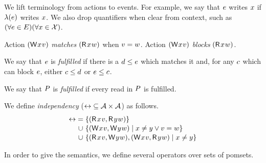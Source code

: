 We lift terminology from actions to events.  For example, we say that $e$
writes $x$ if $\lambda(e)$ writes $x$.  We also drop quantifiers
when clear from context, such as
$(\forall e\in E)(\forall x\in\mathcal{X})$.

\begin{definition}
  Action $\DWP{\aLoc}{\aVal}$ \emph{matches} $\DRP{\aLoc}{\bVal}$ when $v=w$.
  Action $\DWP{\aLoc}{\aVal}$ \emph{blocks} $\DRP{\aLoc}{\bVal}$.
  

  We say that $e$ is \emph{fulfilled} if there is a $d\le e$ which
  matches it and, for any $c$ which can block $e$, either $c\le d$
  or $e\le c$.

  We say that $P$ is \emph{fulfilled} if every read in $P$ is fulfilled.

  We define \emph{independency} (${\mathrel\leftrightarrow}\subseteq\mathcal{A}\times\mathcal{A}$) as follows.
  \begin{align*}
    \reorder &=
    \{(\DR{\aLoc}{\aVal}, \DR{\bLoc}{\bVal}) \}
    \\[-.5ex]&\mkern2mu\cup\mkern2mu
    \{(\DW{\aLoc}{\aVal}, \DW{\bLoc}{\bVal}) \mid \aLoc\neq\bLoc \lor \aVal=\bVal\}
    \\[-.5ex]&\mkern2mu\cup\mkern2mu
    \{(\DR{\aLoc}{\aVal}, \DW{\bLoc}{\bVal}), (\DW{\aLoc}{\aVal}, \DR{\bLoc}{\bVal}) \mid \aLoc\neq\bLoc\}
  \end{align*}
\end{definition}

In order to give the semantics, we define several operators over sets of
pomsets.

